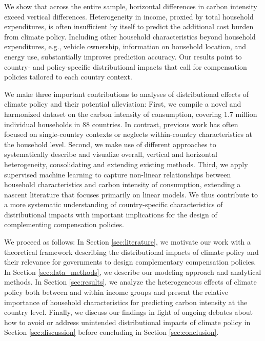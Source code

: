 \documentclass[12pt, a4paper]{article}
\begin{document}
We show that across the entire sample, horizontal differences in carbon intensity exceed vertical differences. Heterogeneity in income, proxied by total household expenditures, is often insufficient by itself to predict the additional cost burden from climate policy. Including other household characteristics beyond household expenditures, e.g., vehicle ownership, information on household location, and energy use, substantially improves prediction accuracy. Our results point to country- and policy-specific distributional impacts that call for compensation policies tailored to each country context.

We make three important contributions to analyses of distributional effects of climate policy and their potential alleviation: First, we compile a novel and harmonized dataset on the carbon intensity of consumption, covering 1.7 million individual households in 88 countries. In contrast, previous work has often focused on single-country contexts or neglects within-country characteristics at the household level. Second, we make use of different approaches to systematically describe and visualize overall, vertical and horizontal heterogeneity, consolidating and extending existing methods. Third, we apply supervised machine learning to capture non-linear relationships between household characteristics and carbon intensity of consumption, extending a nascent literature that focuses primarily on linear models. We thus contribute to a more systematic understanding of country-specific characteristics of distributional impacts with important implications for the design of complementing compensation policies. %

We proceed as follows: In Section \ref{sec:literature}, we motivate our work with a theoretical framework describing the distributional impacts of climate policy and their relevance for governments to design complementary compensation policies. In Section \ref{sec:data_methods}, we describe our modeling approach and analytical methods. In Section \ref{sec:results}, we analyze the heterogeneous effects of climate policy both between and within income groups and present the relative importance of household characteristics for predicting carbon intensity at the country level. Finally, we discuss our findings in light of ongoing debates about how to avoid or address unintended distributional impacts of climate policy in Section \ref{sec:discussion} before concluding in Section \ref{sec:conclusion}.  
\end{document}
